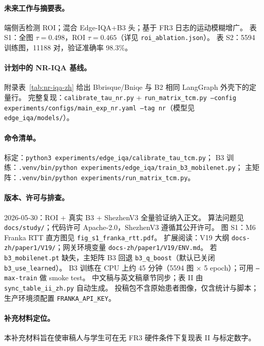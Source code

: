 \paragraph{未来工作与摘要表。}
端侧舌检测 ROI；混合 Edge-IQA+B3 头；基于 FR3 日志的运动模糊增广。
表 S1：全图 $\tau{=}0.498$，ROI $\tau{=}0.465$（详见 \texttt{roi\_ablation.json}）。
表 S2：5594 训练图，11188 对，验证准确率 98.3\%。

\paragraph{计划中的 NR-IQA 基线。}
附录表~\ref{tab:nr-iqa-zh} 给出 Bbrisque/Bniqe 与 B2 相同 LangGraph 外壳下的定量行。
完整复现：\texttt{calibrate\_tau\_nr.py} + \texttt{run\_matrix\_tcm.py --config experiments/configs/main\_exp\_nr.yaml --tag nr}（模型见 \texttt{edge\_iqa/models/}）。

\paragraph{命令清单。}
标定：\texttt{python3 experiments/edge\_iqa/calibrate\_tau\_tcm.py}；
B3 训练：\texttt{.venv/bin/python experiments/edge\_iqa/train\_b3\_mobilenet.py}；
主矩阵：\texttt{.venv/bin/python experiments/run\_matrix\_tcm.py}。

\paragraph{版本、许可与排查。}
2026-05-30：ROI + 真实 B3 + ShezhenV3 全量验证纳入正文。
算法问题见 \texttt{docs/study/}；代码许可 Apache-2.0，ShezhenV3 遵循其公开许可。
图 S1：M6 Franka RTT 直方图见 \texttt{fig\_s1\_franka\_rtt.pdf}。
扩展阅读：V19 大纲 \texttt{docs-zh/paper1/V19/}；网关环境变量 \texttt{docs-zh/paper1/V19/ENV.md}。
若 \texttt{b3\_mobilenet.pt} 缺失，主矩阵 B3 回退 \texttt{b3\_q\_boost}（默认已关闭 \texttt{b3\_use\_learned}）。
B3 训练在 CPU 上约 45 分钟（5594 图 $\times$ 5 epoch）；可用 \texttt{--max-train} 做 smoke test。
中文稿与英文稿章节同步；表 II 由 \texttt{sync\_table\_ii\_zh.py} 自动生成。
投稿包不含原始患者图像，仅含统计与脚本；生产环境须配置 \texttt{FRANKA\_API\_KEY}。

\paragraph{补充材料定位。}
本补充材料旨在使审稿人与学生可在无 FR3 硬件条件下复现表 II 与标定数字。
